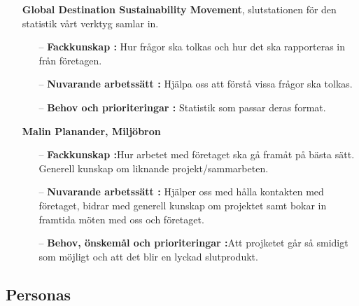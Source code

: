 \documentclass[12pt]{article}
\begin{document}
\begin{itemize}
\begin{itemize}
                \item [] \textbf{Global Destination Sustainability Movement}, slutstationen för den statistik vårt verktyg samlar in.
                    \begin{itemize}
                        \item[--] \textbf{Fackkunskap :} Hur frågor ska tolkas och hur det ska rapporteras in från företagen.
                        \\
                        \item[--] \textbf{Nuvarande arbetssätt :} Hjälpa oss att förstå vissa frågor ska tolkas.
                        \\
                        \item[--] \textbf{Behov och prioriteringar :} Statistik som passar deras format.
                        \\
                    \end{itemize}
                    
                     \item [] \textbf{Malin Planander, Miljöbron}
                    \begin{itemize}
                        \item[--] \textbf{Fackkunskap :}Hur arbetet med företaget ska gå framåt på bästa sätt. Generell kunskap om liknande projekt/sammarbeten.
                        \\
                        \item[--] \textbf{Nuvarande arbetssätt :} Hjälper oss med hålla kontakten med företaget, bidrar med generell kunskap om projektet samt bokar in framtida möten med oss och företaget.
                        \\
                        \item[--] \textbf{Behov, önskemål och prioriteringar :}Att projketet går så smidigt som möjligt och att det blir en lyckad slutprodukt.
                        
                    \end{itemize}
            \end{itemize}
              
        \subsection{Personas}
        

\end{itemize}
\end{document}
